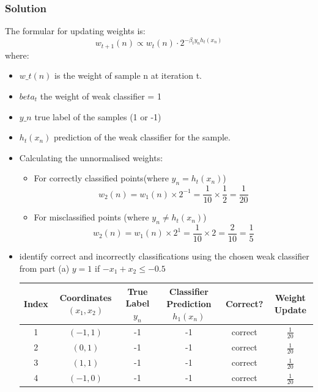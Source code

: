 \documentclass{article}
\begin{document}
\begin{enumerate}[label=\alph*)]
   \subsubsection*{Solution}
   The formular for updating weights is:
   \[
      w_{t+1}(n) \propto w_t(n) \cdot 2^{-\beta_t y_n h_t(x_n)}
   \]
   where:
   \begin{itemize}
      \item \(w\_t(n)\) is the weight of sample n at iteration t.
      \item \(beta_t\) the weight of weak classifier = 1
      \item \(y\_n\) true label of the samples (1 or -1)
      \item \(h_t(x_n)\) prediction of the weak classifier for the sample.
   \end{itemize}
   \begin{itemize}
      \item Calculating the unnormalised weights:
      \begin{itemize}
         \item For correctly classified points(where \(y_n = h_t(x_n)\))
         \[
         w_2(n) = w_1(n) \times 2^{-1} = \frac{1}{10} \times \frac{1}{2} = \frac{1}{20}
         \]
          \item For misclassified points (where \(y_n \neq h_t(x_n)\))
          \[ 
          w_2(n) = w_1(n) \times 2^{1} = \frac{1}{10} \times 2 = \frac{2}{10} = \frac{1}{5}
          \]
      \end{itemize}
      \item identify correct and incorrectly classifications using the chosen weak classifier from part (a) \(y = 1\) if \(-x_1 + x_2 \le -0.5\)
      \begin{table}[h!]
         \centering
         \begin{tabular}{|c|c|c|c|c|c|}
         \hline
         Index & Coordinates $(x_1, x_2)$ & True Label $y_n$ & Classifier Prediction $h_1(x_n)$ & Correct? & Weight Update \\
         \hline
         1 & $(-1, 1)$ & -1 & -1 & correct & \(\frac{1}{20}\) \\
         \hline
         2 & $(0, 1)$ & -1 & -1 & correct & \(\frac{1}{20}\) \\
         \hline
         3 & $(1, 1)$ & -1 & -1 & correct & \(\frac{1}{20}\) \\
         \hline
         4 & $(-1, 0)$ & -1 & -1 & correct & \(\frac{1}{20}\) \\
         \hline

\end{tabular}
\end{table}
\end{itemize}
\end{enumerate}
\end{document}
